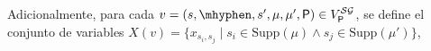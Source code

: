 \begin{definition}
  Adicionalmente, para cada
  $v=(s, \mhyphen, s', \mu, \mu', \Probabilistic) \in V^\SymbG_\Probabilistic$,
  se define el conjunto de variables 
  $X(v)=\{x_{s_i,s_j} \mid s_i \in \text{Supp}(\mu) \wedge s_j \in \text{Supp}(\mu')\}$,

\end{definition}
